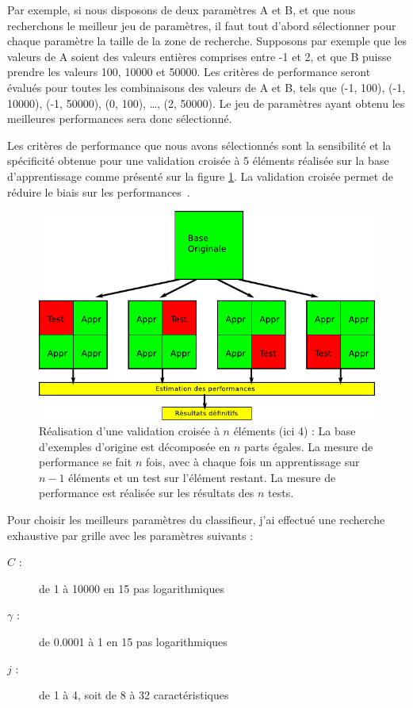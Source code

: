 Par exemple, si nous disposons de deux paramètres A et B, et que nous recherchons le meilleur jeu de paramètres, il faut tout d'abord sélectionner pour chaque paramètre la taille de la zone de recherche. Supposons par exemple que les valeurs de A soient des valeurs entières comprises entre -1 et 2, et que B puisse prendre les valeurs 100, 10000 et 50000. Les critères de performance seront évalués pour toutes les combinaisons des valeurs de A et B, tels que (-1, 100), (-1, 10000), (-1, 50000), (0, 100), \dots, (2, 50000). Le jeu de paramètres ayant obtenu les meilleures performances sera donc sélectionné. 

Les critères de performance que nous avons sélectionnés sont la sensibilité et la spécificité obtenue pour une validation croisée à 5 éléments réalisée sur la base d'apprentissage comme présenté sur la figure \ref{fig:crossValid}. La validation croisée permet de réduire le biais sur les performances~\cite{varma2006bias}.

\begin{figure}[h!]
 \includegraphics[width=15cm]{images/crossValid}
 \caption{Réalisation d'une validation croisée à $n$ éléments (ici 4) : La base d'exemples d'origine est décomposée en $n$ parts égales. La mesure de performance se fait $n$ fois, avec à chaque fois un apprentissage sur $n-1$ éléments et un test sur l'élément restant. La mesure de performance est réalisée sur les résultats des $n$ tests.}
 \label{fig:crossValid}
\end{figure}


Pour choisir les meilleurs paramètres du classifieur, j'ai effectué une recherche exhaustive par grille avec les paramètres suivants :

\begin{description}
 \item [$C$ :] de 1 à 10000 en 15 pas logarithmiques
 \item [$\gamma$ :] de 0.0001 à 1 en 15 pas logarithmiques
 \item [$j$ :] de 1 à 4, soit de 8 à 32 caractéristiques
\end{description}

